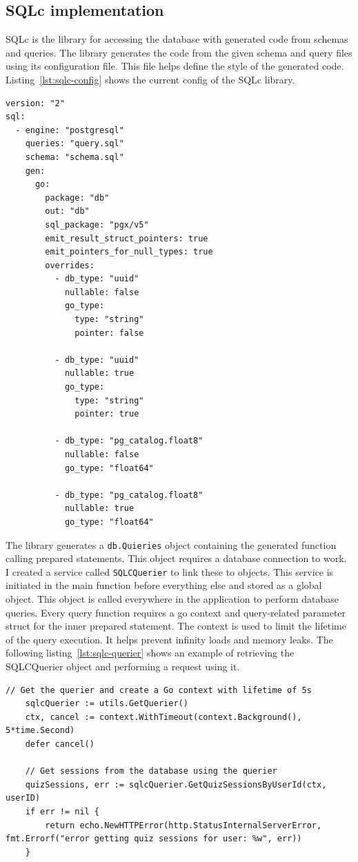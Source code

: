 \subsection{SQLc implementation}

SQLc is the library for accessing the database with generated code from schemas and queries. The library generates the code from the given schema and query files using its configuration file. This file helps define the style of the generated code. Listing~\ref{lst:sqlc-config} shows the current config of the SQLc library.

\begin{lstlisting}[caption=SQLc configuration,label=lst:sqlc-config]
version: "2"
sql:
  - engine: "postgresql"
    queries: "query.sql"
    schema: "schema.sql"
    gen:
      go:
        package: "db"
        out: "db"
        sql_package: "pgx/v5"
        emit_result_struct_pointers: true
        emit_pointers_for_null_types: true
        overrides:
          - db_type: "uuid"
            nullable: false
            go_type:
              type: "string"
              pointer: false

          - db_type: "uuid"
            nullable: true
            go_type:
              type: "string"
              pointer: true

          - db_type: "pg_catalog.float8"
            nullable: false
            go_type: "float64"

          - db_type: "pg_catalog.float8"
            nullable: true
            go_type: "float64"

\end{lstlisting}

The library generates a \texttt{db.Quieries} object containing the generated function calling prepared statements. This object requires a database connection to work. I created a service called \texttt{SQLCQuerier} to link these to objects. This service is initiated in the main function before everything else and stored as a global object. This object is called everywhere in the application to perform database queries. Every query function requires a go context and query-related parameter struct for the inner prepared statement. The context is used to limit the lifetime of the query execution. It helps prevent infinity loads and memory leaks. The following listing~\ref{lst:sqlc-querier} shows an example of retrieving the SQLCQuerier object and performing a request using it.

\begin{lstlisting}[caption=Using the SQLCQuerier,label=lst:sqlc-querier]
	// Get the querier and create a Go context with lifetime of 5s
	sqlcQuerier := utils.GetQuerier()
	ctx, cancel := context.WithTimeout(context.Background(), 5*time.Second)
	defer cancel()

	// Get sessions from the database using the querier
	quizSessions, err := sqlcQuerier.GetQuizSessionsByUserId(ctx, userID)
	if err != nil {
		return echo.NewHTTPError(http.StatusInternalServerError, fmt.Errorf("error getting quiz sessions for user: %w", err))
	}
\end{lstlisting}

